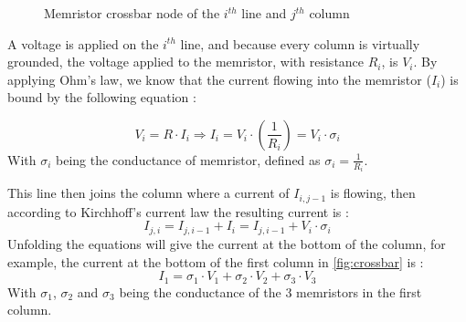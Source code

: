 \begin{figure}[t]
  \centering
  
  \caption{Memristor crossbar node of the $i^{th}$ line and $j^{th}$ column}
  \label{fig:crossNode}
\end{figure}

A voltage is applied on the $i^{th}$ line, and because every column is virtually grounded, the voltage applied to the memristor, with resistance $R_i$, is $V_i$. By applying Ohm's law, we know that the current flowing into the memristor ($I_{i}$) is bound by the following equation :

\begin{equation}
  V_i = R\cdot I_{i} \Rightarrow I_{i} = V_i\cdot (\frac{1}{R_i})= V_i\cdot\sigma_i
\end{equation}
With $\sigma_i$ being the conductance of memristor, defined as $\sigma_i=\frac{1}{R_i}$.

This line then joins the column where a current of $I_{i,j-1}$ is flowing, then according to Kirchhoff's current law the resulting current is :
\begin{equation}
  I_{j,i} = I_{j,i-1}+I_{i} = I_{j,i-1} + V_i\cdot\sigma_i
\end{equation}
Unfolding the equations will give the current at the bottom of the column, for example, the current at the bottom of the first column in \cref{fig:crossbar} is :
\begin{equation}
  I_1=\sigma_1\cdot V_1 + \sigma_2\cdot V_2 + \sigma_3\cdot V_3
\end{equation}
With $\sigma_1$, $\sigma_2$ and $\sigma_3$ being the conductance of the 3 memristors in the first column.
